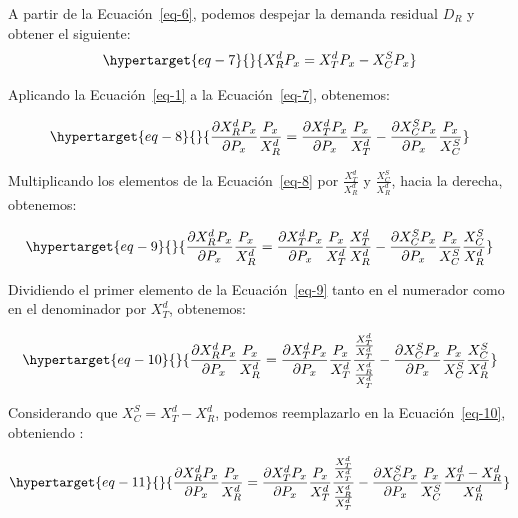 \documentclass[
  letterpaper,
  DIV=11,
  numbers=noendperiod]{scrartcl}
\begin{document}
A partir de la Ecuación~\ref{eq-6}, podemos despejar la demanda residual
\(D_R\) y obtener el siguiente:
\begin{equation}\protect\hypertarget{eq-7}{}{
X_R^d P_x = X_T^d P_x - X_C^S P_x
}\label{eq-7}\end{equation}

Aplicando la Ecuación~\ref{eq-1} a la Ecuación~\ref{eq-7}, obtenemos:

\begin{equation}\protect\hypertarget{eq-8}{}{
\frac{\partial X_R^d P_x}{\partial P_x} \frac{P_x}{X_R^d} = \frac{\partial X_T^d P_x}{\partial P_x} \frac{P_x}{X_T^d} - \frac{\partial X_C^S P_x}{\partial P_x} \frac{P_x}{X_C^S}
}\label{eq-8}\end{equation}

Multiplicando los elementos de la Ecuación~\ref{eq-8} por
\(\frac{X_T^d}{X_R^d}\) y \(\frac{X_C^S}{X_R^d}\), hacia la derecha,
obtenemos:

\begin{equation}\protect\hypertarget{eq-9}{}{
\frac{\partial X_R^d P_x}{\partial P_x} \frac{P_x}{X_R^d} = \frac{\partial X_T^d P_x}{\partial P_x} \frac{P_x}{X_T^d} \frac{X_T^d}{X_R^d} - \frac{\partial X_C^S P_x}{\partial P_x} \frac{P_x}{X_C^S} \frac{X_C^S}{X_R^d}
}\label{eq-9}\end{equation}

Dividiendo el primer elemento de la Ecuación~\ref{eq-9} tanto en el
numerador como en el denominador por \(X_T^d\), obtenemos:

\begin{equation}\protect\hypertarget{eq-10}{}{
\frac{\partial X_R^d P_x}{\partial P_x} \frac{P_x}{X_R^d} = \frac{\partial X_T^d P_x}{\partial P_x} \frac{P_x}{X_T^d} \frac{\frac{X_T^d}{X_T^d}}{\frac{X_R^d}{X_T^d}} - \frac{\partial X_C^S P_x}{\partial P_x} \frac{P_x}{X_C^S} \frac{X_C^S}{X_R^d}
}\label{eq-10}\end{equation}

Considerando que \(X_C^S = X_T^d - X_R^d\), podemos reemplazarlo en la
Ecuación~\ref{eq-10}, obteniendo :

\begin{equation}\protect\hypertarget{eq-11}{}{
\frac{\partial X_R^d P_x}{\partial P_x} \frac{P_x}{X_R^d} = \frac{\partial X_T^d P_x}{\partial P_x} \frac{P_x}{X_T^d} \frac{\frac{X_T^d}{X_T^d}}{\frac{X_R^d}{X_T^d}} - \frac{\partial X_C^S P_x}{\partial P_x} \frac{P_x}{X_C^S} \frac{X_T^d - X_R^d}{X_R^d}
}\label{eq-11}\end{equation}
\end{document}
